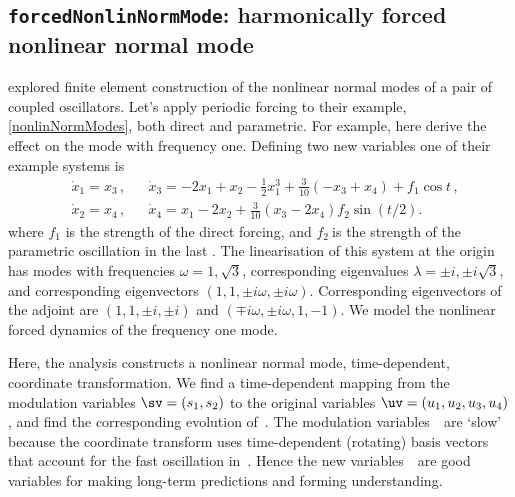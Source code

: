 \subsection{\texttt{forcedNonlinNormMode}: harmonically forced nonlinear normal mode} 
\label{forcedNonlinNormMode}

\cite{Renson2012}  explored finite element construction of
the nonlinear normal modes of a pair of coupled oscillators.
Let's apply periodic forcing to their example,
\cref{nonlinNormModes}, both direct and parametric. For
example, here derive the effect on the mode with frequency
one. Defining two new variables one of their example systems
is
\begin{align*}
&\dot x_1=x_3\,,
&&\dot x_3=-2x_1+x_2-\frac12x_1^3+\frac3{10}(-x_3+x_4)+f_1\cos t\,,
\\&\dot x_2=x_4\,,
&&\dot x_4=x_1-2x_2+\frac3{10}(x_3-2x_4)f_2\sin(t/2).
\end{align*}
where \(f_1\) is the strength of the direct forcing, and
\(f_2~\)is the strength of the parametric oscillation in the
last \ode.  The linearisation of this system at the origin
has modes with frequencies \(\omega=1,\sqrt3\),
corresponding eigenvalues \(\lambda=\pm i,\pm i\sqrt3\), and
corresponding eigenvectors \((1,1,\pm i\omega,\pm
i\omega)\).  Corresponding  eigenvectors of the adjoint are
\((1,1,\pm i,\pm i)\) and \((\mp i\omega,\pm
i\omega,1,-1)\).   We model the nonlinear forced dynamics of
the frequency one mode.

Here, the analysis constructs a nonlinear normal mode,
time-dependent, coordinate transformation. We find a
time-dependent mapping from the modulation variables
\(\sv=(s_1,s_2)\) to the original variables
\(\uv=(u_1,u_2,u_3,u_4)\), and find the corresponding
evolution of~\sv. The modulation variables~\sv\ are `slow'
because the coordinate transform uses time-dependent
(rotating) basis vectors that account for the fast
oscillation in~\uv. Hence the new variables~\sv\ are good
variables for making long-term predictions and forming
understanding.


